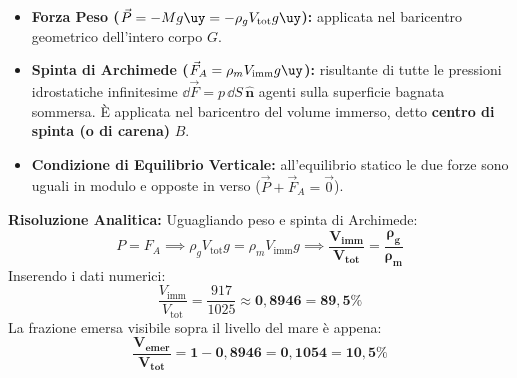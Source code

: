 \begin{tcolorbox}[enhanced, breakable, colback=forestgreen!5!white, colframe=forestgreen!80!black,
    title={\textbf{Analisi delle Forze Idrostatiche e Punti di Applicazione}}, fonttitle=\bfseries\sffamily]
\begin{itemize}
    \item \textbf{Forza Peso ($\vec{P} = -M g\uy = -\rho_g V_{\text{tot}} g\uy$):} applicata nel baricentro geometrico dell'intero corpo $G$.
    \item \textbf{Spinta di Archimede ($\vec{F}_A = \rho_m V_{\text{imm}} g\uy$):} risultante di tutte le pressioni idrostatiche infinitesime $\dd\vec{F} = p\,\dd S\,\hat{\bm{n}}$ agenti sulla superficie bagnata sommersa. È applicata nel baricentro del volume immerso, detto \textbf{centro di spinta (o di carena)} $B$.
    \item \textbf{Condizione di Equilibrio Verticale:} all'equilibrio statico le due forze sono uguali in modulo e opposte in verso ($\vec{P} + \vec{F}_A = \vec{0}$).
\end{itemize}
\end{tcolorbox}

\textbf{Risoluzione Analitica:}
Uguagliando peso e spinta di Archimede:
\begin{equation}
    P = F_A \implies \rho_g V_{\text{tot}} g = \rho_m V_{\text{imm}} g \implies \mathbf{\frac{V_{\text{imm}}}{V_{\text{tot}}} = \frac{\rho_g}{\rho_m}}
\end{equation}
Inserendo i dati numerici:
\begin{equation}
    \frac{V_{\text{imm}}}{V_{\text{tot}}} = \frac{917}{1025} \approx \mathbf{0{,}8946 = 89{,}5\%}
\end{equation}
La frazione emersa visibile sopra il livello del mare è appena:
\begin{equation}
    \mathbf{\frac{V_{\text{emer}}}{V_{\text{tot}}} = 1 - 0{,}8946 = 0{,}1054 = 10{,}5\%}
\end{equation}

